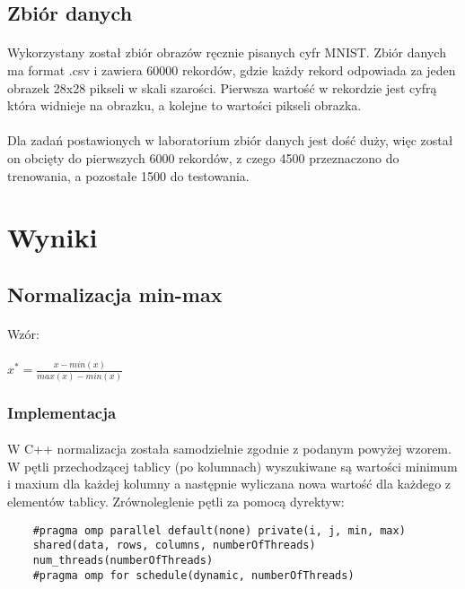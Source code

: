 \documentclass[a4paper,11pt]{article}
\begin{document}
\subsection{Zbiór danych} 
\paragraph{}Wykorzystany został zbiór obrazów ręcznie pisanych cyfr MNIST. Zbiór danych ma format .csv i zawiera 60000 rekordów, gdzie każdy rekord odpowiada za jeden obrazek 28x28 pikseli w skali szarości. Pierwsza wartość w rekordzie jest cyfrą która widnieje na obrazku, a kolejne to wartości pikseli obrazka. 
\paragraph{}
Dla zadań postawionych w laboratorium zbiór danych jest dość duży, więc został on obcięty do pierwszych 6000 rekordów, z czego 4500 przeznaczono do trenowania, a pozostałe 1500 do testowania.
\newpage    
\section{Wyniki}   
\subsection{Normalizacja min-max} 
\paragraph{}Wzór:
\paragraph{}$x^*=\frac{x-min(x)}{max(x)-min(x)}$
\subsubsection{Implementacja} 
\paragraph{}W C++ normalizacja została samodzielnie zgodnie z podanym powyżej wzorem. W pętli przechodzącej tablicy (po kolumnach) wyszukiwane są wartości minimum i maxium dla każdej kolumny a następnie wyliczana nowa wartość dla każdego z elementów tablicy. Zrównoleglenie pętli za pomocą dyrektyw:
\begin{lstlisting}
	#pragma omp parallel default(none) private(i, j, min, max) 
	shared(data, rows, columns, numberOfThreads)
	num_threads(numberOfThreads)
	#pragma omp for schedule(dynamic, numberOfThreads)\end{lstlisting}
\end{document}
